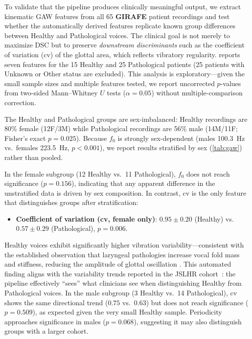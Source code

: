 \documentclass[preprint,12pt]{elsarticle}
\newcommand{\girafe}{\textbf{GIRAFE}}
\newcommand{\gaw}{GAW}
\begin{document}
To validate that the pipeline produces clinically meaningful output, we
extract kinematic \gaw{} features from all \num{65} \girafe{} patient
recordings and test whether the automatically derived features replicate
known group differences between Healthy and Pathological voices.
The clinical goal is not merely to maximize DSC but to preserve
\emph{downstream discriminants} such as the coefficient of variation (cv)
of the glottal area, which reflects vibratory regularity.
 reports seven features for the \num{15} Healthy and
\num{25} Pathological patients (\num{25} patients with Unknown or Other status are
excluded).
This analysis is exploratory---given the small sample sizes and multiple
features tested, we report uncorrected $p$-values from two-sided
Mann--Whitney $U$ tests ($\alpha = 0.05$) without multiple-comparison
correction.

The Healthy and Pathological groups are sex-imbalanced: Healthy
recordings are \num{80}\% female (\num{12}F/\num{3}M) while Pathological
recordings are \num{56}\% male (\num{14}M/\num{11}F; Fisher's exact
$p{=}0.025$).
Because $f_0$ is strongly sex-dependent (males \SI{100.3}{Hz} vs.\
females \SI{223.5}{Hz}, $p{<}0.001$), we report results stratified by
sex (\cref{tab:gaw}) rather than pooled.

In the female subgroup (\num{12} Healthy vs.\ \num{11} Pathological),
$f_0$ does not reach significance ($p{=}0.156$), indicating that any
apparent difference in the unstratified data is driven by sex composition.
In contrast, cv is the only feature that distinguishes groups after
stratification:

\begin{itemize}
  \item \textbf{Coefficient of variation (cv, female only)}:
    \(0.95\pm0.20\) (Healthy) vs.\ \(0.57\pm0.29\) (Pathological),
    $p{=}0.006$.
\end{itemize}

\noindent Healthy voices exhibit significantly higher vibration
variability---consistent with the established observation that laryngeal
pathologies increase vocal fold mass and stiffness, reducing the amplitude
of glottal oscillation
\cite{patel2016nodules,little2007glottal}.
This automated finding aligns with the variability trends reported in the
JSLHR cohort~\cite{patel2015kinematic}: the pipeline effectively
``sees'' what clinicians see when distinguishing Healthy from Pathological
voices.
In the male subgroup (\num{3} Healthy vs.\ \num{14} Pathological), cv
shows the same directional trend ($0.75$ vs.\ $0.63$) but does not reach
significance ($p{=}0.509$), as expected given the very small Healthy
sample.  Periodicity approaches significance in males ($p{=}0.068$),
suggesting it may also distinguish groups with a larger cohort.
\end{document}
